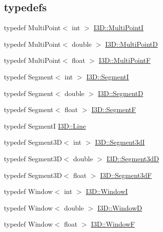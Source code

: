 \subsection*{\textquotesingle{}typedefs\textquotesingle{}}
\begin{DoxyCompactItemize}
\item 
typedef Multi\+Point$<$ int $>$ \hyperlink{group___geometric_entities_gacd97741d89ded5ad4fbe71d32309e62b}{I3\+D\+::\+Multi\+PointI}
\item 
typedef Multi\+Point$<$ double $>$ \hyperlink{group___geometric_entities_ga17d41c547edd7b9a916383723c0aeaec}{I3\+D\+::\+Multi\+PointD}
\item 
typedef Multi\+Point$<$ float $>$ \hyperlink{group___geometric_entities_ga7e19d99de4e64c17e396f090e87d438b}{I3\+D\+::\+Multi\+PointF}
\item 
typedef Segment$<$ int $>$ \hyperlink{group___geometric_entities_ga929ca9aa27110ed7f1cf79c92664a6f0}{I3\+D\+::\+SegmentI}
\item 
typedef Segment$<$ double $>$ \hyperlink{group___geometric_entities_ga34bc194945585b7126a92e06c0571d5a}{I3\+D\+::\+SegmentD}
\item 
typedef Segment$<$ float $>$ \hyperlink{group___geometric_entities_gade7ab34fb1636ee6e5f7661bd0ae1937}{I3\+D\+::\+SegmentF}
\item 
typedef SegmentI \hyperlink{group___geometric_entities_ga483b43891a1b33d99406fdc397e9a445}{I3\+D\+::\+Line}
\item 
typedef Segment3D$<$ int $>$ \hyperlink{group___geometric_entities_ga72a4680dd55c05cb4bb23a5154cde78c}{I3\+D\+::\+Segment3dI}
\item 
typedef Segment3D$<$ double $>$ \hyperlink{group___geometric_entities_gaffa1ff3b7d6fb99b524c6666e5d8e71c}{I3\+D\+::\+Segment3dD}
\item 
typedef Segment3D$<$ float $>$ \hyperlink{group___geometric_entities_ga286317644075744b4d6cc62daad74747}{I3\+D\+::\+Segment3dF}
\item 
typedef Window$<$ int $>$ \hyperlink{group___geometric_entities_ga27980d94ceb3f3eb9e0c34e1fe93b073}{I3\+D\+::\+WindowI}
\item 
typedef Window$<$ double $>$ \hyperlink{group___geometric_entities_gac7dc7b0477e34c4c8c43a1710a855b00}{I3\+D\+::\+WindowD}
\item 
typedef Window$<$ float $>$ \hyperlink{group___geometric_entities_ga76e43e50a665fdfb754f5825615ffaec}{I3\+D\+::\+WindowF}
\end{DoxyCompactItemize}
